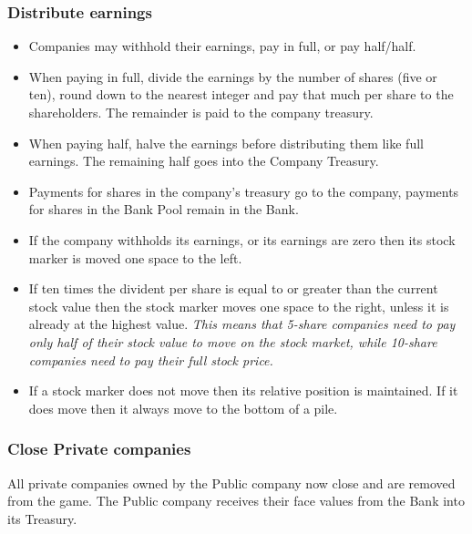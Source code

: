 \documentclass[a4paper,twocolumn]{article}
\begin{document}
\subsubsection{Distribute earnings}
\begin{itemize}
	\item Companies may withhold their earnings, pay in full, or pay half/half.
	\item When paying in full, divide the earnings by the number of shares (five
	or ten), round down to the nearest integer and pay that much per share to
	the shareholders. The remainder is paid to the company treasury.
	\item When paying half, halve the earnings before distributing them like
	full earnings. The remaining half goes into the Company Treasury.
	\item Payments for shares in the company's treasury go to the company,
	payments for shares in the Bank Pool remain in the Bank.
	\item If the company withholds its earnings, or its earnings are zero then
	its stock marker is moved one space to the left.
	\item If ten times the divident per share is equal to or greater than the
	current stock value then the stock marker moves one space to the right,
	unless it is already at the highest value. \emph{This means that 5-share
	companies need to pay only half of their stock value to move on the stock
	market, while 10-share companies need to pay their full stock price.}
	\item If a stock marker does not move then its relative position is
	maintained. If it does move then it always move to the bottom of a pile.
\end{itemize}

\subsubsection{Close Private companies}
All private companies owned by the Public company now close and are removed
from the game. The Public company receives their face values from the Bank into
its Treasury.
\end{document}
